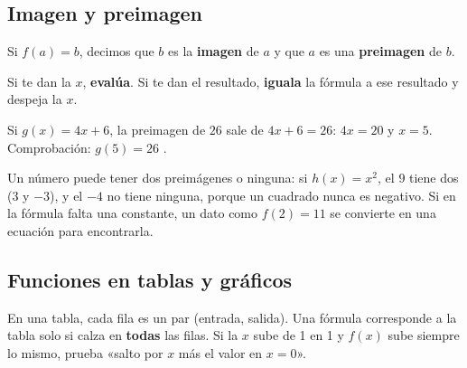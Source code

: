 \subsection{Imagen y preimagen}
Si $f(a) = b$, decimos que $b$ es la \textbf{imagen} de $a$ y que $a$ es una \textbf{preimagen} de $b$.
\begin{clave} Si te dan la $x$, \textbf{evalúa}. Si te dan el resultado, \textbf{iguala} la fórmula a ese resultado y despeja la $x$.\end{clave}
\begin{ejemplo} Si $g(x) = 4x + 6$, la preimagen de $26$ sale de $4x + 6 = 26$: $4x = 20$ y $x = 5$. Comprobación: $g(5) = 26$ \checkmark.\end{ejemplo}
Un número puede tener dos preimágenes o ninguna: si $h(x) = x^2$, el $9$ tiene dos ($3$ y $-3$), y el $-4$ no tiene ninguna, porque un cuadrado nunca es negativo. Si en la fórmula falta una constante, un dato como $f(2) = 11$ se convierte en una ecuación para encontrarla.

\subsection{Funciones en tablas y gráficos}
En una tabla, cada fila es un par (entrada, salida). Una fórmula corresponde a la tabla solo si calza en \textbf{todas} las filas. Si la $x$ sube de 1 en 1 y $f(x)$ sube siempre lo mismo, prueba «salto por $x$ más el valor en $x = 0$».

